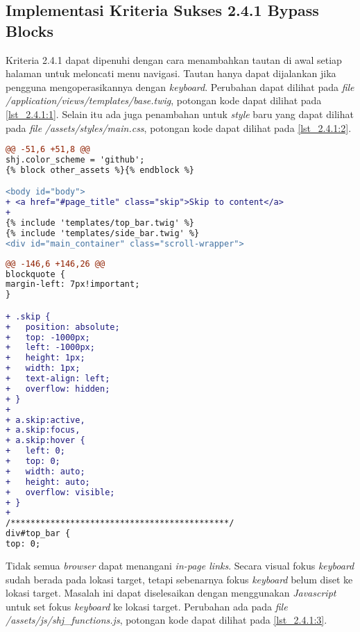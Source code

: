 \subsection{Implementasi Kriteria Sukses 2.4.1 Bypass Blocks}
\label{subsec:implementasi_A_2.4.1}

Kriteria 2.4.1 dapat dipenuhi dengan cara menambahkan tautan di awal setiap halaman untuk meloncati menu navigasi. Tautan hanya dapat dijalankan jika pengguna mengoperasikannya dengan \textit{keyboard}. Perubahan dapat dilihat pada \textit{file} \textit{/application/views/templates/base.twig}, potongan kode dapat dilihat pada \ref{lst_2.4.1:1}. Selain itu ada juga penambahan untuk \textit{style} baru yang dapat dilihat pada \textit{file} \textit{/assets/styles/main.css}, potongan kode dapat dilihat pada \ref{lst_2.4.1:2}.

\begin{lstlisting}[language=diff, caption=Perubahan pada \textit{file} \textit{base.twig}, label=lst_2.4.1:1, basicstyle=\ttfamily, frame=single,
columns=fullflexible, keepspaces=true, breaklines=true]
@@ -51,6 +51,8 @@ 
shj.color_scheme = 'github';
{% block other_assets %}{% endblock %}

<body id="body">
+ <a href="#page_title" class="skip">Skip to content</a>
+ 
{% include 'templates/top_bar.twig' %}
{% include 'templates/side_bar.twig' %}
<div id="main_container" class="scroll-wrapper">
\end{lstlisting}

\begin{lstlisting}[language=diff, caption=Penambahan \textit{style} untul kelas \textit{skip}, label=lst_2.4.1:2, basicstyle=\ttfamily, frame=single,
columns=fullflexible, keepspaces=true, breaklines=true]
@@ -146,6 +146,26 @@ 
blockquote {
margin-left: 7px!important;
}

+ .skip {
+ 	position: absolute;
+ 	top: -1000px;
+ 	left: -1000px;
+ 	height: 1px;
+ 	width: 1px;
+ 	text-align: left;
+ 	overflow: hidden;
+ }
+ 
+ a.skip:active, 
+ a.skip:focus, 
+ a.skip:hover {
+ 	left: 0; 
+ 	top: 0;
+ 	width: auto; 
+ 	height: auto; 
+ 	overflow: visible; 
+ }
+ 
/********************************************/
div#top_bar {
top: 0;
\end{lstlisting}

Tidak semua \textit{browser} dapat menangani \textit{in-page links}. Secara visual fokus \textit{keyboard} sudah berada pada lokasi target, tetapi sebenarnya fokus \textit{keyboard} belum diset ke lokasi target. Masalah ini dapat diselesaikan dengan menggunakan \textit{Javascript} untuk set fokus \textit{keyboard} ke lokasi target. Perubahan ada pada \textit{file} \textit{/assets/js/shj\_functions.js}, potongan kode dapat dilihat pada \ref{lst_2.4.1:3}.

